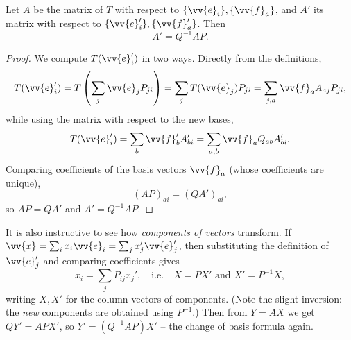 \begin{theorem}
	Let $A$ be the matrix of $T$ with respect to $\{\vv{e}_i\}, \{\vv{f}_a\}$, and $A'$ its matrix with respect to $\{\vv{e}_i'\}, \{\vv{f}_a'\}$. Then
	$$
	A' = Q^{-1}AP.
	$$
\end{theorem}
\begin{proof}
	We compute $T(\vv{e}_i')$ in two ways. Directly from the definitions,
	$$
	T(\vv{e}_i') = T\left(\sum_j \vv{e}_j P_{ji}\right) = \sum_j T(\vv{e}_j)P_{ji} = \sum_{j, a} \vv{f}_a A_{aj}P_{ji},
	$$
	while using the matrix with respect to the new bases,
	$$
	T(\vv{e}_i') = \sum_b \vv{f}_b' A'_{bi} = \sum_{a, b} \vv{f}_a Q_{ab}A'_{bi}.
	$$
	Comparing coefficients of the basis vectors $\vv{f}_a$ (whose coefficients are unique),
	$$
	(AP)_{ai} = (QA')_{ai},
	$$
	so $AP = QA'$ and $A' = Q^{-1}AP$.
\end{proof}

It is also instructive to see how \emph{components of vectors} transform. If $\vv{x} = \sum_i x_i \vv{e}_i = \sum_j x_j' \vv{e}_j'$, then substituting the definition of $\vv{e}_j'$ and comparing coefficients gives
$$
x_i = \sum_j P_{ij}x_j', \quad \text{i.e.} \quad X = PX' \text{ and } X' = P^{-1}X,
$$
writing $X, X'$ for the column vectors of components. (Note the slight inversion: the \emph{new} components are obtained using $P^{-1}$.) Then from $Y = AX$ we get $QY' = APX'$, so $Y' = (Q^{-1}AP)X'$ -- the change of basis formula again.

